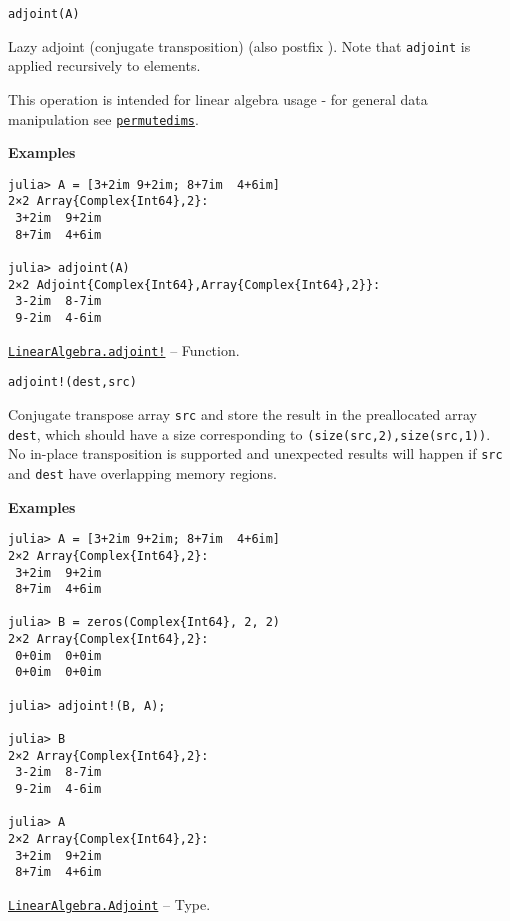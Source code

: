 \begin{adjustwidth}{2em}{0pt}


\begin{verbatim}
adjoint(A)
\end{verbatim}

Lazy adjoint (conjugate transposition) (also postfix \texttt{{\textquotesingle}}). Note that \texttt{adjoint} is applied recursively to elements.

This operation is intended for linear algebra usage - for general data manipulation see \hyperlink{10913801624539723467}{\texttt{permutedims}}.

\textbf{Examples}


\begin{verbatim}
julia> A = [3+2im 9+2im; 8+7im  4+6im]
2×2 Array{Complex{Int64},2}:
 3+2im  9+2im
 8+7im  4+6im

julia> adjoint(A)
2×2 Adjoint{Complex{Int64},Array{Complex{Int64},2}}:
 3-2im  8-7im
 9-2im  4-6im
\end{verbatim}



\end{adjustwidth}
\hypertarget{9871500626629337445}{} 
\hyperlink{9871500626629337445}{\texttt{LinearAlgebra.adjoint!}}  -- {Function.}

\begin{adjustwidth}{2em}{0pt}


\begin{verbatim}
adjoint!(dest,src)
\end{verbatim}

Conjugate transpose array \texttt{src} and store the result in the preallocated array \texttt{dest}, which should have a size corresponding to \texttt{(size(src,2),size(src,1))}. No in-place transposition is supported and unexpected results will happen if \texttt{src} and \texttt{dest} have overlapping memory regions.

\textbf{Examples}


\begin{verbatim}
julia> A = [3+2im 9+2im; 8+7im  4+6im]
2×2 Array{Complex{Int64},2}:
 3+2im  9+2im
 8+7im  4+6im

julia> B = zeros(Complex{Int64}, 2, 2)
2×2 Array{Complex{Int64},2}:
 0+0im  0+0im
 0+0im  0+0im

julia> adjoint!(B, A);

julia> B
2×2 Array{Complex{Int64},2}:
 3-2im  8-7im
 9-2im  4-6im

julia> A
2×2 Array{Complex{Int64},2}:
 3+2im  9+2im
 8+7im  4+6im
\end{verbatim}



\end{adjustwidth}
\hypertarget{10784859587547982593}{} 
\hyperlink{10784859587547982593}{\texttt{LinearAlgebra.Adjoint}}  -- {Type.}

